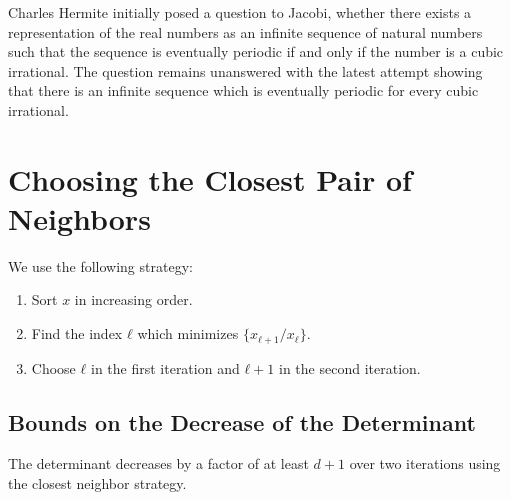 \documentclass[english,version-2020-11]{uzl-thesis}
\begin{document}
Charles Hermite initially posed a question to Jacobi, whether there exists a
representation of the real numbers as an infinite sequence of natural numbers
such that the sequence is eventually periodic if and only if the number is a
cubic irrational. The question remains unanswered with the latest attempt
\cite{Murru15} showing that there is an infinite sequence which is eventually
periodic for every cubic irrational.


\chapter{Choosing the Closest Pair of Neighbors}


We use the following strategy:

\begin{enumerate}
  \item Sort $x$ in increasing order.
  \item Find the index $ℓ$ which minimizes $\{x_{ℓ+1}/x_ℓ\}$.
  \item Choose $ℓ$ in the first iteration and $ℓ + 1$ in the second iteration.
\end{enumerate}

\section{Bounds on the Decrease of the Determinant}

\begin{theorem}
  The determinant decreases by a factor of at least $d+1$ over two iterations
  using the closest neighbor strategy.
\end{theorem}
\end{document}

